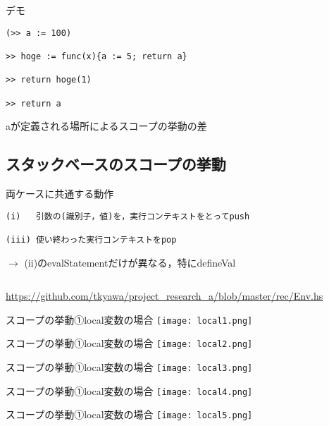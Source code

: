 \documentclass[uplatex,dvipdfmx,ja=standard]{beamer}
\begin{document}
\begin{frame}[fragile]{デモ}
    \begin{verbatim}
(>> a := 100)

>> hoge := func(x){a := 5; return a}

>> return hoge(1)

>> return a
    \end{verbatim}
aが定義される場所によるスコープの挙動の差
\end{frame}

\subsection{スタックベースのスコープの挙動}

\begin{frame}[fragile]{両ケースに共通する動作}
    \begin{verbatim}
(i)   引数の(識別子，値)を，実行コンテキストをとってpush

(iii) 使い終わった実行コンテキストをpop
    \end{verbatim}
$\to$ (ii)のevalStatementだけが異なる，特にdefineVal
    \begin{verbatim}
    \end{verbatim}

\url{https://github.com/tkyawa/project_research_a/blob/master/rec/Env.hs}
\end{frame}

\begin{frame}[fragile]{スコープの挙動①local変数の場合}
    \centering 
    \texttt{[image: local1.png]}
\end{frame}


\begin{frame}[fragile]{スコープの挙動①local変数の場合}
    \centering 
    \texttt{[image: local2.png]}
\end{frame}


\begin{frame}[fragile]{スコープの挙動①local変数の場合}
    \centering 
    \texttt{[image: local3.png]}
\end{frame}


\begin{frame}[fragile]{スコープの挙動①local変数の場合}
    \centering 
    \texttt{[image: local4.png]}
\end{frame}


\begin{frame}[fragile]{スコープの挙動①local変数の場合}
    \centering 
    \texttt{[image: local5.png]}
\end{frame}
\end{document}

